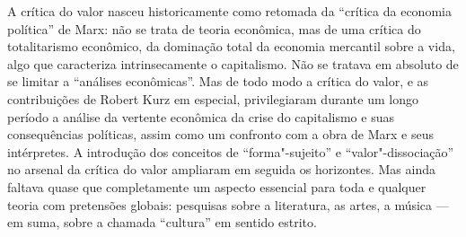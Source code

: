 A crítica do valor nasceu historicamente como retomada da ``crítica da
economia política'' de Marx: não se trata de teoria econômica, mas de
uma crítica do totalitarismo econômico, da dominação total da economia
mercantil sobre a vida, algo que caracteriza intrinsecamente o
capitalismo. Não se tratava em absoluto de se limitar a ``análises
econômicas''. Mas de todo modo a crítica do valor, e as contribuições de
Robert Kurz em especial, privilegiaram durante um longo período a
análise da vertente econômica da crise do capitalismo e suas
consequências políticas, assim como um confronto com a obra de Marx e
seus intérpretes. A introdução dos conceitos de ``forma"-sujeito'' e
``valor"-dissociação'' no arsenal da crítica do valor ampliaram em
seguida os horizontes. Mas ainda faltava quase que completamente um
aspecto essencial para toda e qualquer teoria com pretensões globais:
pesquisas sobre a literatura, as artes, a música --- em suma, sobre a
chamada ``cultura'' em sentido estrito.

